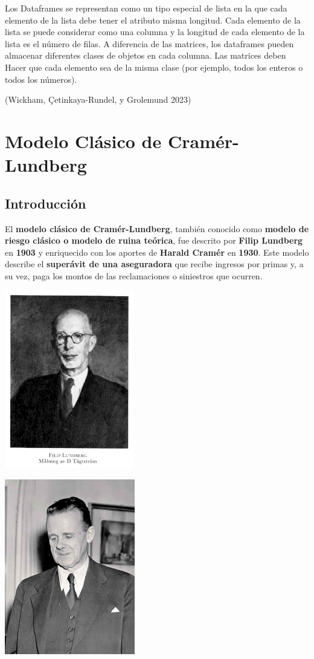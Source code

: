 \documentclass[
  us-letterpaper,
]{scrreprt}
\theoremstyle{plain}
\theoremstyle{plain}
\theoremstyle{definition}
\theoremstyle{remark}
\begin{document}
Los Dataframes se representan como un tipo especial de lista en la que
cada elemento de la lista debe tener el atributo misma longitud. Cada
elemento de la lista se puede considerar como una columna y la longitud
de cada elemento de la lista es el número de filas. A diferencia de las
matrices, los dataframes pueden almacenar diferentes clases de objetos
en cada columna. Las matrices deben Hacer que cada elemento sea de la
misma clase (por ejemplo, todos los enteros o todos los números).

(Wickham, Çetinkaya-Rundel, y Grolemund 2023)


\chapter{Modelo Clásico de Cramér-Lundberg}\label{sec-modelo_C_L}

\section{Introducción}\label{introducciuxf3n-1}

El \textbf{modelo clásico de Cramér-Lundberg}, también conocido como
\textbf{modelo de riesgo clásico o modelo de ruina teórica}, fue
descrito por \textbf{Filip Lundberg} en \textbf{1903} y enriquecido con
los aportes de \textbf{Harald Cramér} en \textbf{1930}. Este modelo
describe el \textbf{superávit de una aseguradora} que recibe ingresos
por primas y, a su vez, paga los montos de las reclamaciones o
siniestros que ocurren.

\includegraphics[width=2.21875in,height=\textheight]{Filip_Lundberg.jpg}

\includegraphics[width=2.23958in,height=\textheight]{harald-cramr.jpg}
\end{document}
